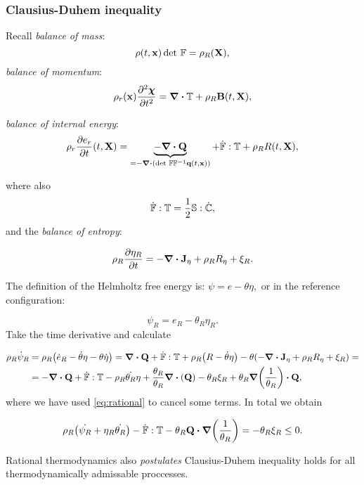 \documentclass[11pt]{scrartcl} %
\begin{document}
\subsubsection{Clausius-Duhem inequality}
\label{sec:clausius}

Recall \textit{balance of mass}:
\[
	\rho \qty(t,\vb{x}) \det\, \mathbb{F} = \rho_{R}\qty(\vb{X}),
\]
\textit{balance of momentum}:
\[
	\rho_r\qty(\vb{x})\pdv[2]{\vb*{\chi}}{t} = \divergence{\pkstress}+ \rho_R \vb{B}\qty(t,\vb{X}),
\]

\textit{balance of internal energy}:
\[
	\rho_r \pdv{e_r}{t}\qty(t,\vb{X}) = \underbrace{- \divergence{\vb{Q}}}_{= - \divergence{\qty(\detf \inverse{\fgrad}\vb{q}\qty(t,\vb{x}))}} + \dot{\fgrad}: \pkstress + \rho_R R\qty(t,\vb{X}),
\]

where also
\[
	\dot{\mathbb{F}}:\mathbb{T} = \frac{1}{2}\mathbb{S}: \dot{\mathbb{C}},
\]
and the \textit{balance of entropy}:

\[
	\rho_R \pdv{\eta_R}{t} = -\divergence{\vb{J}_{\eta}}+\rho_R R_{\eta} + \xi_R.
\]

The definition of the Helmholtz free energy is: $\psi = e - \theta \eta,$ or in the reference configuration:

\[
	\psi_R = e_R - \theta_R \eta_R.
\]
Take the time derivative and calculate 

\begin{align*}
	\rho_R \dot{\psi}_R &= \rho_R\qty(\dot{e}_R - \dot{\theta}\eta - \theta \dot{\eta}) = \divergence{\vb{Q}} + \dot{\fgrad} : \pkstress + \rho_R \qty(R - \dot{\theta} \eta) - \theta\qty(-\divergence{\vb{J}_{\eta}}+\rho_R R_{\eta}+\xi_R) = \\
			    & = - \divergence{\vb{Q}}+\dot{\fgrad} : \pkstress - \rho_{R} \dot{\theta_R}\eta + \frac{\theta_R}{\theta_R}\divergence{\qty(\vb{Q})} - \theta_R \xi_R +  \theta_R \grad\qty(\frac{1}{\theta_R})\vdot\vb{Q},
\end{align*}
where we have used \ref{eq:rational} to cancel some terms. In total we obtain

\begin{tcolorbox}
\begin{equation}
	\label{eq:clausis_duhem}
	\rho_R\qty(\dot{\psi_R}+ \eta_R \dot{\theta_R}) - \dot{\fgrad}: \pkstress - \theta_R \vb{Q}\vdot \grad\qty(\frac{1}{\theta_R})	= -\theta_R \xi_R \leq 0.
\end{equation}
\end{tcolorbox}

Rational thermodynamics also \textit{postulates} Clausius-Duhem inequality holds for all thermodynamically admissable proccesses.
\end{document}
